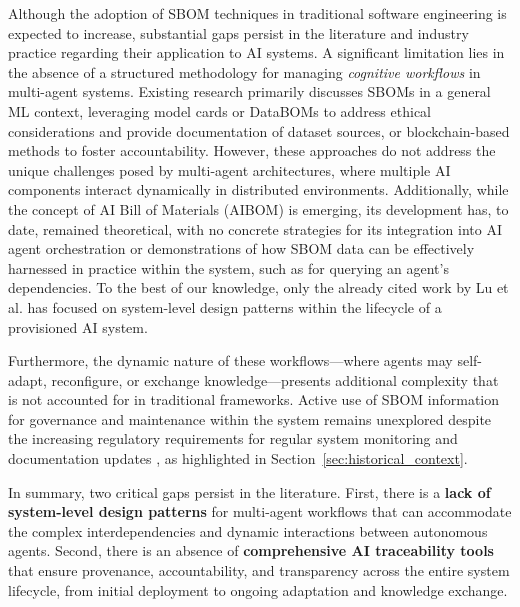 Although the adoption of SBOM techniques in traditional software engineering is expected to increase, substantial gaps persist in the literature and industry practice regarding their application to AI systems. A significant limitation lies in the absence of a structured methodology for managing \textit{cognitive workflows} in multi-agent systems. Existing research primarily discusses SBOMs in a general ML context, leveraging model cards \cite{mitchell2019model} or DataBOMs \cite{Barclay2019} to address ethical considerations and provide documentation of dataset sources, or blockchain-based methods \cite{xia2024trust, barclay2022providing} to foster accountability. However, these approaches do not address the unique challenges posed by multi-agent architectures, where multiple AI components interact dynamically in distributed environments. Additionally, while the concept of AI Bill of Materials (AIBOM) is emerging, its development has, to date, remained theoretical, with no concrete strategies for its integration into AI agent orchestration or demonstrations of how SBOM data can be effectively harnessed in practice within the system, such as for querying an agent’s dependencies. To the best of our knowledge, only the already cited work by Lu et al.  \cite{lu2023responsible} has focused on system-level design patterns within the lifecycle of a provisioned AI system.

Furthermore, the dynamic nature of these workflows—where agents may self-adapt, reconfigure, or exchange knowledge—presents additional complexity that is not accounted for in traditional frameworks. Active use of SBOM information for governance and maintenance within the system remains unexplored despite the increasing regulatory requirements for regular system monitoring and documentation updates \cite{eu_ai_act_2024, federalregister2020}, as highlighted in Section~\ref{sec:historical_context}.


In summary, two critical gaps persist in the literature. First, there is a \textbf{lack of system-level design patterns} for multi-agent workflows that can accommodate the complex interdependencies and dynamic interactions between autonomous agents. Second, there is an absence of \textbf{comprehensive AI traceability tools} that ensure provenance, accountability, and transparency across the entire system lifecycle, from initial deployment to ongoing adaptation and knowledge exchange.
